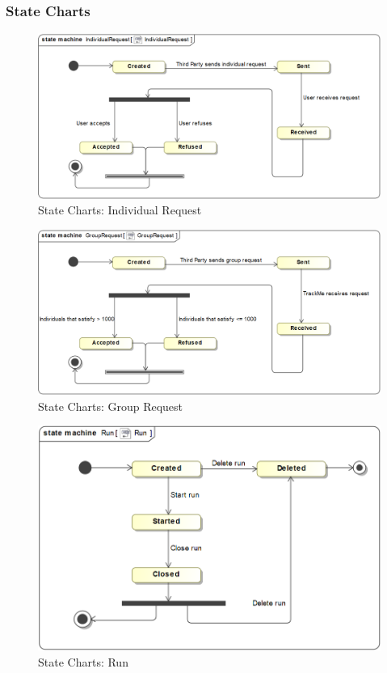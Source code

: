 \documentclass[a4paper]{article}
\begin{document}
    \subsubsection{State Charts}
    \begin{figure}[!ht]
        \centering
        \includegraphics[width=\textwidth, keepaspectratio]{images/UML/state_individualRequest.png}
        \caption{State Charts: Individual Request}
        \label{fig:state_individual}
    \end{figure}
    \begin{figure}[!ht]
        \centering
        \includegraphics[width=\textwidth, keepaspectratio]{images/UML/state_groupRequest.png}
        \caption{State Charts: Group Request}
        \label{fig:state_group}
    \end{figure}
    \begin{figure}[!ht]
        \centering
        \includegraphics[width=\textwidth, keepaspectratio]{images/UML/state_run.png}
        \caption{State Charts: Run}
        \label{fig:state_run}
    \end{figure}
    
\end{document}

